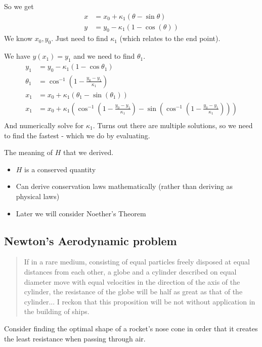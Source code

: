 \documentclass{E:/Documents/Latex/myassignment}
\begin{document}
So we get
\begin{align*}
	x &= x_0 + \kappa_1 (\theta - \sin\theta)\\
	y &= y_0 - \kappa_1 (1 - \cos(\theta))
\end{align*}
We know $x_0,y_0$. Just need to find $\kappa_1$ (which relates to the end point).

We have $y(x_1) = y_1$ and we need to find $\theta_1$.
\begin{align*}
	y_1 &= y_0 - \kappa_1(1-\cos \theta_1)\\
	\theta_1 &= \cos^{-1}\left(1- \frac{y_0-y_1 }{\kappa_1}\right)\\
	x_1 &= x_0 + \kappa_1(\theta_1 - \sin(\theta_1))\\
	x_1	&= x_0 + \kappa_1(\cos^{-1}\left(1- \frac{y_0-y_1 }{\kappa_1}\right) - \sin(\cos^{-1}\left(1- \frac{y_0-y_1 }{\kappa_1}\right)))\\
\end{align*}
And numerically solve for $\kappa_1$. 
Turns out there are multiple solutions, so we need to find the fastest - which we do by evaluating.


The meaning of $H$ that we derived.
\begin{itemize}
	\item $H$ is a conserved quantity
	\item Can derive conservation laws mathematically (rather than deriving as physical laws)
	\item Later we will consider Noether's Theorem
\end{itemize}

\subsection{Newton's Aerodynamic problem}
\begin{quote}
	If in a rare medium, consisting of equal particles freely disposed at equal distances from each other, a globe and a cylinder described on equal diameter move with equal velocities in the direction of the axis of the cylinder, the resistance of the globe will be half as great as that of the cylinder... I reckon that this proposition will be not without application in the building of ships.
\end{quote}
Consider finding the optimal shape of a rocket's nose cone in order that it creates the least resistance when passing through air.
\end{document}
